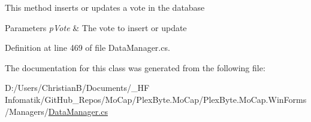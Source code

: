 This method inserts or updates a vote in the database 


\begin{DoxyParams}{Parameters}
{\em p\+Vote} & The vote to insert or update\\
\hline
\end{DoxyParams}


Definition at line 469 of file Data\+Manager.\+cs.



The documentation for this class was generated from the following file\+:\begin{DoxyCompactItemize}
\item 
D\+:/\+Users/\+Christian\+B/\+Documents/\+\_\+\+H\+F Infomatik/\+Git\+Hub\+\_\+\+Repos/\+Mo\+Cap/\+Plex\+Byte.\+Mo\+Cap/\+Plex\+Byte.\+Mo\+Cap.\+Win\+Forms/\+Managers/\hyperlink{_data_manager_8cs}{Data\+Manager.\+cs}\end{DoxyCompactItemize}
